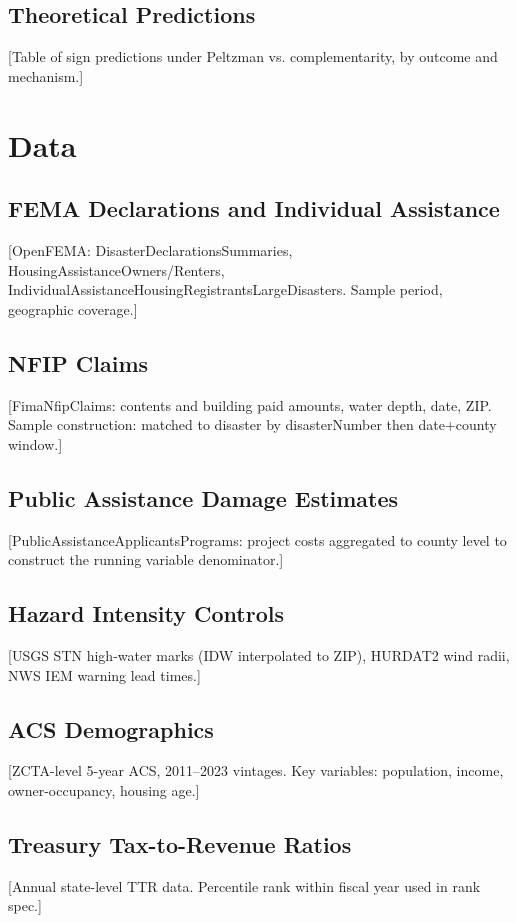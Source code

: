 \documentclass[12pt]{article}
\begin{document}
\subsection{Theoretical Predictions}
[Table of sign predictions under Peltzman vs. complementarity, by outcome and mechanism.]

\section{Data}
\label{sec:data}

\subsection{FEMA Declarations and Individual Assistance}
[OpenFEMA: DisasterDeclarationsSummaries, HousingAssistanceOwners/Renters,
IndividualAssistanceHousingRegistrantsLargeDisasters. Sample period, geographic coverage.]

\subsection{NFIP Claims}
[FimaNfipClaims: contents and building paid amounts, water depth, date, ZIP.
Sample construction: matched to disaster by disasterNumber then date+county window.]

\subsection{Public Assistance Damage Estimates}
[PublicAssistanceApplicantsPrograms: project costs aggregated to county level
to construct the running variable denominator.]

\subsection{Hazard Intensity Controls}
[USGS STN high-water marks (IDW interpolated to ZIP), HURDAT2 wind radii,
NWS IEM warning lead times.]

\subsection{ACS Demographics}
[ZCTA-level 5-year ACS, 2011--2023 vintages. Key variables: population, income,
owner-occupancy, housing age.]

\subsection{Treasury Tax-to-Revenue Ratios}
[Annual state-level TTR data. Percentile rank within fiscal year used in rank spec.]
\end{document}
